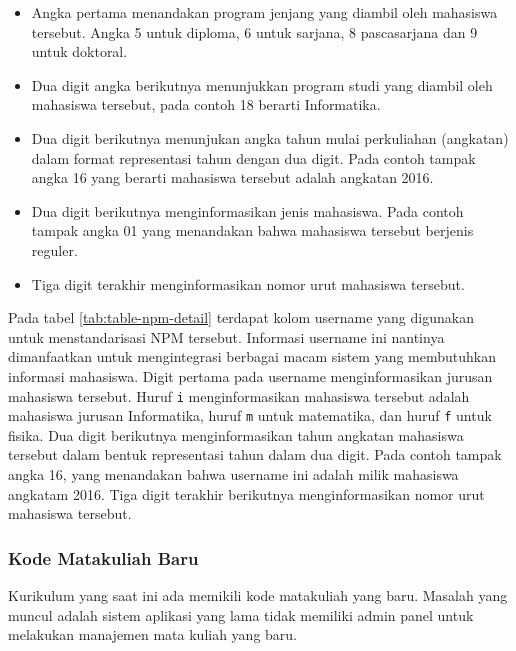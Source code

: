    \begin{itemize}
        \item Angka pertama menandakan program jenjang yang diambil oleh mahasiswa
        tersebut. Angka 5 untuk diploma, 6 untuk sarjana, 8 pascasarjana dan 9 untuk
        doktoral. 
    
        \item Dua digit angka berikutnya menunjukkan program studi yang diambil oleh
        mahasiswa tersebut, pada contoh 18 berarti Informatika. 
        
        \item Dua digit berikutnya menunjukan angka tahun mulai perkuliahan
        (angkatan) dalam format representasi tahun dengan dua digit. Pada contoh
        tampak angka 16 yang berarti mahasiswa tersebut adalah angkatan 2016. 
        
        \item Dua digit berikutnya menginformasikan jenis mahasiswa. Pada contoh
        tampak angka 01 yang menandakan bahwa mahasiswa tersebut berjenis reguler.
        
        \item Tiga digit terakhir menginformasikan nomor urut mahasiswa tersebut.
    \end{itemize}
    
    Pada tabel \ref{tab:table-npm-detail} terdapat kolom username yang digunakan
    untuk menstandarisasi NPM tersebut. Informasi username ini nantinya
    dimanfaatkan untuk mengintegrasi berbagai macam sistem yang membutuhkan
    informasi mahasiswa. Digit pertama pada username menginformasikan jurusan
    mahasiswa tersebut. Huruf \texttt{i} menginformasikan mahasiswa tersebut
    adalah mahasiswa jurusan Informatika, huruf \texttt{m} untuk matematika, dan
    huruf \texttt{f} untuk fisika. Dua digit berikutnya menginformasikan tahun
    angkatan mahasiswa tersebut dalam bentuk representasi tahun dalam dua digit.
    Pada contoh tampak angka 16, yang menandakan bahwa username ini adalah milik
    mahasiswa angkatam 2016. Tiga digit terakhir berikutnya menginformasikan
    nomor urut mahasiswa tersebut.
    
    \subsubsection{Kode Matakuliah Baru}\label{ref-prob-admin-kode-mk-baru}
    Kurikulum yang saat ini ada memikili kode matakuliah yang baru. Masalah yang
    muncul adalah sistem aplikasi yang lama tidak memiliki admin panel untuk
    melakukan manajemen mata kuliah yang baru.
    
